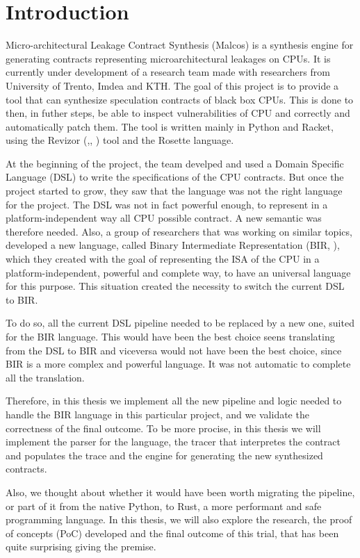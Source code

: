 \chapter{Introduction}
\label{cha:introduction}

Micro-architectural Leakage Contract Synthesis (Malcos) is a synthesis engine
for generating contracts representing microarchitectural leakages on CPUs. It is
currently under development of a research team made with researchers from University
of Trento, Imdea and KTH. The goal of this project is to provide a tool that can
synthesize speculation contracts of black box CPUs. This is done to then, in futher
steps, be able to inspect vulnerabilities of CPU and correctly and automatically
patch them. The tool is written mainly in Python and Racket, using the Revizor (\cite{article},\cite{repo},
\cite{misc}) tool and the Rosette language.

At the beginning of the project, the team develped and used a Domain Specific
Language (DSL) to write the specifications of the CPU contracts. But once the project
started to grow, they saw that the language was not the right language for the
project. The DSL was not in fact powerful enough, to represent in a platform-independent
way all CPU possible contract. A new semantic was therefore needed. Also, a group
of researchers that was working on similar topics, developed a new language, called
Binary Intermediate Representation (BIR, \cite{bir_pub}), which they created with
the goal of representing the ISA of the CPU in a platform-independent, powerful
and complete way, to have an universal language for this purpose. This situation
created the necessity to switch the current DSL to BIR.

To do so, all the current DSL pipeline needed to be replaced by a new one,
suited for the BIR language. This would have been the best choice seens translating
from the DSL to BIR and viceversa would not have been the best choice, since BIR
is a more complex and powerful language. It was not automatic to complete all the
translation.

Therefore, in this thesis we implement all the new pipeline and logic needed to
handle the BIR language in this particular project, and we validate the correctness
of the final outcome. To be more procise, in this thesis we will implement the parser
for the language, the tracer that interpretes the contract and populates the
trace and the engine for generating the new synthesized contracts.

Also, we thought about whether it would have been worth migrating the pipeline,
or part of it from the native Python, to Rust, a more performant and safe
programming language. In this thesis, we will also explore the research, the proof
of concepts (PoC) developed and the final outcome of this trial, that has been
quite surprising giving the premise.

